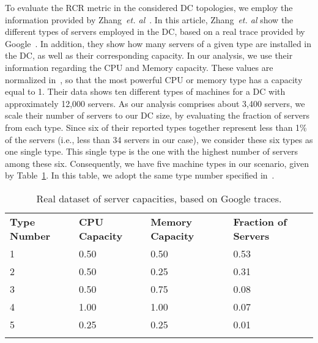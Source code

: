 To evaluate the RCR metric in the considered DC topologies, we employ the information provided by Zhang~\textit{et. al}~\cite{zhang2014Dynamic}. In this article, Zhang~\textit{et. al} show the different types of servers employed in the DC, based on a real trace provided by Google~\cite{googleCusterData}. In addition, they show how many servers of a given type are installed in the DC, as well as their corresponding capacity. In our analysis, we use their information regarding the CPU and Memory capacity. These values are normalized in~\cite{zhang2014Dynamic}, so that the most powerful CPU or memory type has a capacity equal to 1. Their data shows ten different types of machines for a DC with approximately 12,000 servers. As our analysis comprises about 3,400 servers, we scale their number of servers to our DC size, by evaluating the fraction of servers from each type. Since six of their reported types together represent less than 1\% of the servers (i.e., less than 34 servers in our case), we consider these six types as one single type. This single type is the one with the highest number of servers among these six. Consequently, we have five machine types in our scenario, given by Table~\ref{tab:googleData}. In this table, we adopt the same type number specified in~\cite{zhang2014Dynamic}.
\begin{table}
\caption{Real dataset of server capacities, based on Google traces.}
\label{tab:googleData}
\begin{tabular}{llll}
\hline\noalign{\smallskip}
\hline \textbf{Type Number} &\textbf{CPU Capacity} &\textbf{Memory Capacity} &\textbf{Fraction of Servers}\\
\noalign{\smallskip}\hline\noalign{\smallskip}
1 &0.50 &0.50 &0.53 \\
2 &0.50 &0.25 &0.31 \\
3 &0.50 &0.75 &0.08 \\
4 &1.00 &1.00 &0.07 \\
5 &0.25 &0.25 &0.01 \\
\noalign{\smallskip}\hline
\end{tabular}
\end{table}

